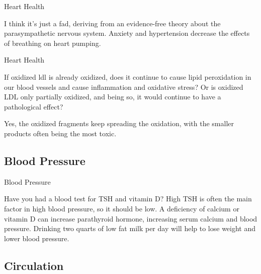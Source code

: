 \documentclass[11pt,oneside,openany,extrafontsizes]{memoir}
\begin{document}
\begin{standalonequote}{Heart Health}

    \begin{answer}
      I think it's just a fad, deriving from an evidence-free theory about the parasympathetic nervous system. Anxiety and hypertension decrease the effects of breathing on heart pumping.
    \end{answer}
\end{standalonequote}

\begin{qaexchange}{Heart Health}

    \begin{question}
        If oxidized ldl is already oxidized, does it continue to cause lipid peroxidation in our blood vessels and cause inflammation and oxidative stress? Or is oxidized LDL only partially oxidized, and being so, it would continue to have a pathological effect?
    \end{question}

    \begin{answer}
      Yes, the oxidized fragments keep spreading the oxidation, with the smaller products often being the most toxic.
    \end{answer}
\end{qaexchange}

\subsection{Blood Pressure}

\begin{standalonequote}{Blood Pressure}

    \begin{answer}
      Have you had a blood test for TSH and vitamin D? High TSH is often the main factor in high blood pressure, so it should be low. A deficiency of calcium or vitamin D can increase parathyroid hormone, increasing serum calcium and blood pressure. Drinking two quarts of low fat milk per day will help to lose weight and lower blood pressure.
    \end{answer}
\end{standalonequote}

\subsection{Circulation}
\end{document}
